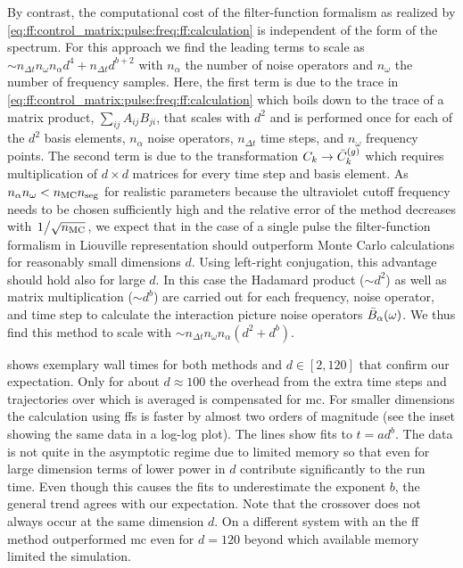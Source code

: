 By contrast, the computational cost of the filter-function formalism as realized by \cref{eq:ff:control_matrix:pulse:freq:ff:calculation} is independent of the form of the spectrum.
For this approach we find the leading terms to scale as $\sim n_{\Delta t} n_\omega n_\alpha d^{4} + n_{\Delta t} d^{b+2}$ with $n_\alpha$ the number of noise operators and $n_\omega$ the number of frequency samples.
Here, the first term is due to the trace in \cref{eq:ff:control_matrix:pulse:freq:ff:calculation} which boils down to the trace of a matrix product, $\sum_{ij} A_{ij} B_{ji}$, that scales with $d^2$ and is performed once for each of the $d^2$ basis elements, $n_\alpha$ noise operators, $n_{\Delta t}$ time steps, and $n_\omega$ frequency points.
The second term is due to the transformation $C_k\rightarrow\bar{C}^{(g)}_k$ which requires multiplication of $d\times d$ matrices for every time step and basis element.
As $n_\alpha n_\omega < n_{\mathrm{MC}} n_{\mathrm{seg}}$ for realistic parameters because the ultraviolet cutoff frequency needs to be chosen sufficiently high and the relative error of the method decreases with $\flatfrac{1}{\sqrt{n_\mr{MC}}}$, we expect that in the case of a single pulse the filter-function formalism in Liouville representation should outperform Monte Carlo calculations for reasonably small dimensions $d$.
Using left-right conjugation, this advantage should hold also for large $d$.
In this case the Hadamard product ($\sim d^2$) as well as matrix multiplication ($\sim d^b$) are carried out for each frequency, noise operator, and time step to calculate the interaction picture noise operators $\bar{B}_\alpha(\omega)$.
We thus find this method to scale with $\sim n_{\Delta t} n_\omega n_\alpha (d^2 + d^b)$.

 shows exemplary wall times for both methods and $d\in[2,120]$ that confirm our expectation.
Only for about $d\approx\num{100}$ the overhead from the extra time steps and trajectories over which is averaged is compensated for \gls{mc}.
For smaller dimensions the calculation using \glspl{ff} is faster by almost two orders of magnitude (see the inset showing the same data in a log-log plot).
The lines show fits to $t = a d^b$.
The data is not quite in the asymptotic regime due to limited memory so that even for large dimension terms of lower power in $d$ contribute significantly to the run time.
Even though this causes the fits to underestimate the exponent $b$, the general trend agrees with our expectation.
Note that the crossover does not always occur at the same dimension $d$.
On a different system with an \fastprocessor the \gls{ff} method outperformed \gls{mc} even for $d = 120$ beyond which available memory limited the simulation.


